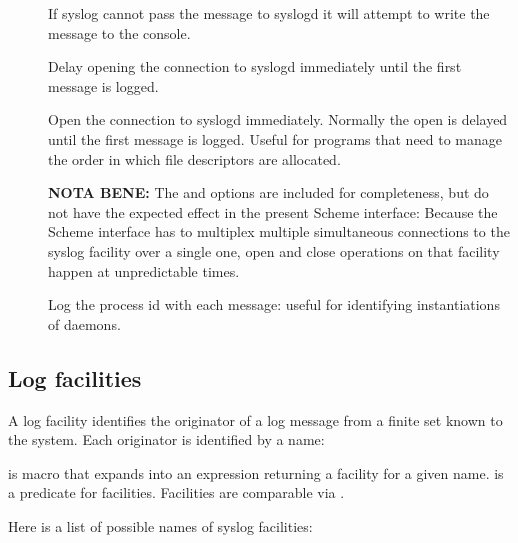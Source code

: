 \begin{description}
\item[]
  If syslog cannot pass the message to syslogd it will attempt to
  write the message to the console.

\item[]
  Delay opening the connection to syslogd immediately until the first
  message is logged.

\item[]
  Open the connection to syslogd immediately.  Normally
  the open is delayed until the first message is logged.
  Useful for programs that need to manage the order in which
  file descriptors are allocated.

  \noindent\textbf{NOTA BENE:}
  The  and  options are included for
  completeness, but do not have the expected effect in the present
  Scheme interface: Because the Scheme interface has to multiplex
  multiple simultaneous connections to the syslog facility over a
  single one, open and close operations on that facility happen at
  unpredictable times.
  
\item[]
  Log the process id with each message: useful for identifying
  instantiations of daemons.
\end{description}

\subsection*{Log facilities}

A log facility identifies the originator of a log message from a
finite set known to the system.  Each originator is identified by a
name:


\begin{desc}
   is macro that expands into an expression
  returning a facility for a given name.   is a
  predicate for facilities.  Facilities are comparable via .
\end{desc}
%
Here is a list of possible names of syslog facilities:

